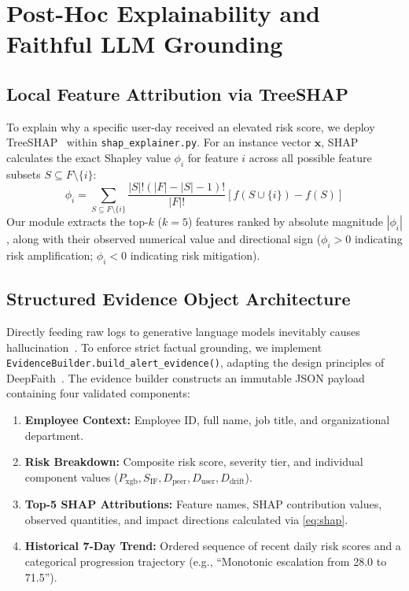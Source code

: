 \documentclass[conference]{IEEEtran}
\begin{document}
\section{Post-Hoc Explainability and Faithful LLM Grounding}
\label{sec:explainability}

\subsection{Local Feature Attribution via TreeSHAP}
To explain why a specific user-day received an elevated risk score, we deploy TreeSHAP~\cite{lundberg2017unified} within \texttt{shap\_explainer.py}. For an instance vector $\mathbf{x}$, SHAP calculates the exact Shapley value $\phi_i$ for feature $i$ across all possible feature subsets $S \subseteq F \setminus \{i\}$:
\begin{equation}
    \phi_i = \sum_{S \subseteq F \setminus \{i\}} \frac{|S|!(|F| - |S| - 1)!}{|F|!} \left[f(S \cup \{i\}) - f(S)\right]
    \label{eq:shap}
\end{equation}
Our module extracts the top-$k$ ($k=5$) features ranked by absolute magnitude $|\phi_i|$, along with their observed numerical value and directional sign ($\phi_i > 0$ indicating risk amplification; $\phi_i < 0$ indicating risk mitigation).

\subsection{Structured Evidence Object Architecture}
Directly feeding raw logs to generative language models inevitably causes hallucination~\cite{si2024faithlens}. To enforce strict factual grounding, we implement \texttt{EvidenceBuilder.build\_alert\_evidence()}, adapting the design principles of DeepFaith~\cite{phan2026deepfaith}. The evidence builder constructs an immutable JSON payload containing four validated components:
\begin{enumerate}
    \item \textbf{Employee Context:} Employee ID, full name, job title, and organizational department.
    \item \textbf{Risk Breakdown:} Composite risk score, severity tier, and individual component values ($P_{\text{xgb}}, S_{\text{IF}}, D_{\text{peer}}, D_{\text{user}}, D_{\text{drift}}$).
    \item \textbf{Top-5 SHAP Attributions:} Feature names, SHAP contribution values, observed quantities, and impact directions calculated via \eqref{eq:shap}.
    \item \textbf{Historical 7-Day Trend:} Ordered sequence of recent daily risk scores and a categorical progression trajectory (e.g., ``Monotonic escalation from 28.0 to 71.5'').
\end{enumerate}
\end{document}
